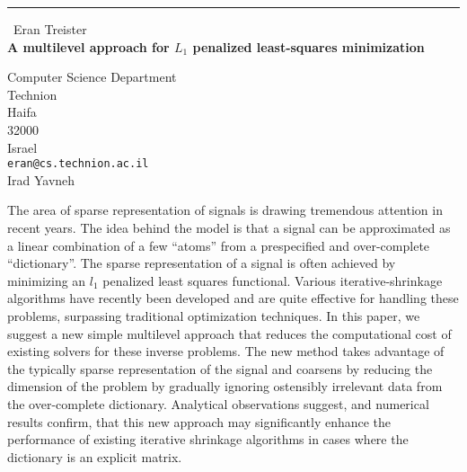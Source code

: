 \documentclass{report}
\begin{document}
\begin{center}
\rule{6in}{1pt} \
{\large Eran Treister \\
{\bf A multilevel approach for $\textit{L}_1$ penalized least-squares minimization}}

Computer Science Department \\ Technion\ \\ Haifa\ \\ 32000\ \\ Israel
\\
{\tt eran@cs.technion.ac.il}\\
Irad Yavneh\end{center}

The area of sparse representation of signals is drawing tremendous
attention in recent years. The idea behind the model is that a
signal can be approximated as a linear combination of a few
``atoms'' from a prespecified and over-complete ``dictionary''.
The sparse representation of a signal is often achieved by
minimizing an $l_1$ penalized least squares functional. Various
iterative-shrinkage algorithms have recently been developed and
are quite effective for handling these problems, surpassing
traditional optimization techniques. In this paper, we suggest a
new simple multilevel approach that reduces the computational cost
of existing solvers for these inverse problems. The new method
takes advantage of the typically sparse representation of the
signal and coarsens by reducing the dimension of the problem by
gradually ignoring ostensibly irrelevant data from the
over-complete dictionary. Analytical observations suggest, and
numerical results confirm, that this new approach may
significantly enhance the performance of existing iterative
shrinkage algorithms in cases where the dictionary is an explicit
matrix.
\end{document}
